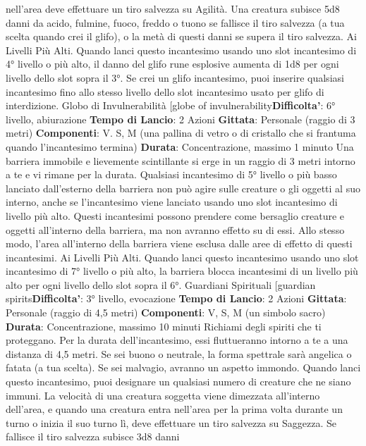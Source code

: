 \begin{multicols}{2}
nell’area deve effettuare un tiro salvezza su Agilità.
Una creatura subisce 5d8 danni da acido, fulmine,
fuoco, freddo o tuono se fallisce il tiro salvezza (a tua
scelta quando crei il glifo), o la metà di questi danni se
supera il tiro salvezza.
Ai Livelli Più Alti. Quando lanci questo incantesimo
usando uno slot incantesimo di 4° livello o più alto, il
danno del glifo rune esplosive aumenta di 1d8 per ogni
livello dello slot sopra il 3°. Se crei un glifo incantesimo,
puoi inserire qualsiasi incantesimo fino allo stesso
livello dello slot incantesimo usato per glifo di
interdizione.
Globo di Invulnerabilità
[globe of invulnerability\textbf{Difficolta'}:
6° livello, abiurazione
\textbf{Tempo di Lancio}: 2 Azioni
\textbf{Gittata}: Personale (raggio di 3 metri)
\textbf{Componenti}: V. S, M (una pallina di vetro o di cristallo
che si frantuma quando l’incantesimo termina)
\textbf{Durata}: Concentrazione, massimo 1 minuto
Una barriera immobile e lievemente scintillante si erge
in un raggio di 3 metri intorno a te e vi rimane per la
durata.
Qualsiasi incantesimo di 5° livello o più basso lanciato
dall’esterno della barriera non può agire sulle creature o
gli oggetti al suo interno, anche se l’incantesimo viene
lanciato usando uno slot incantesimo di livello più alto.
Questi incantesimi possono prendere come bersaglio
creature e oggetti all’interno della barriera, ma non
avranno effetto su di essi. Allo stesso modo, l’area
all’interno della barriera viene esclusa dalle aree di
effetto di questi incantesimi.
Ai Livelli Più Alti. Quando lanci questo incantesimo
usando uno slot incantesimo di 7° livello o più alto, la
barriera blocca incantesimi di un livello più alto per ogni
livello dello slot sopra il 6°.
Guardiani Spirituali
[guardian spirits\textbf{Difficolta'}:
3° livello, evocazione
\textbf{Tempo di Lancio}: 2 Azioni
\textbf{Gittata}: Personale (raggio di 4,5 metri)
\textbf{Componenti}: V, S, M (un simbolo sacro)
\textbf{Durata}: Concentrazione, massimo 10 minuti
Richiami degli spiriti che ti proteggano. Per la durata
dell’incantesimo, essi fluttueranno intorno a te a una
distanza di 4,5 metri. Se sei buono o neutrale, la forma
spettrale sarà angelica o fatata (a tua scelta). Se sei
malvagio, avranno un aspetto immondo.
Quando lanci questo incantesimo, puoi designare un
qualsiasi numero di creature che ne siano immuni. La
velocità di una creatura soggetta viene dimezzata
all’interno dell’area, e quando una creatura entra
nell’area per la prima volta durante un turno o inizia il
suo turno lì, deve effettuare un tiro salvezza su
Saggezza. Se fallisce il tiro salvezza subisce 3d8 danni

\end{multicols}
